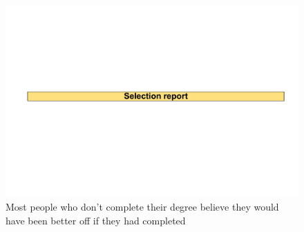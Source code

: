                 \begin{figure}
                    \caption{Most people who don't complete their degree believe they would have been better off if they had completed\label{fig:12}}%
                    \includegraphics[page=15]{atlas/selection_chartdeck.pdf} 
                \end{figure}




